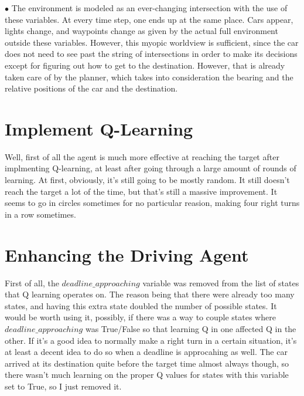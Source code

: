 \documentclass{amsart}
\begin{document}
\begin{list}{$\bullet$}{\addtolength{\parsep}{1mm}}
The environment is modeled as an ever-changing intersection with the use of these variables.  At every time step, one ends up at the same place.  Cars appear, lights change, and waypoints change as given by the actual full environment outside these variables.  However, this myopic worldview is sufficient, since the car does not need to see past the string of intersections in order to make its decisions except for figuring out how to get to the destination.  However, that is already taken care of by the planner, which takes into consideration the bearing and the relative positions of the car and the destination.
\end{list}
\section{Implement Q-Learning}
Well, first of all the agent is much more effective at reaching the target after implmenting Q-learning, at least after going through a large amount of rounds of learning.  At first, obviously, it's still going to be mostly random.  It still doesn't reach the target a lot of the time, but that's still a massive improvement.    It seems to go in circles sometimes for no particular reasion, making four right turns in a row sometimes.  
\section{Enhancing the Driving Agent}
First of all, the $deadline\_approaching$ variable was removed from the list of states that Q learning operates on.  The reason being that there were already too many states, and having this extra state doubled the number of possible states.  It would be worth using it, possibly, if there was a way to couple states where $deadline\_approaching$ was True/False so that learning Q in one affected Q in the other.  If it's a good idea to normally make a right turn in a certain situation, it's at least a decent idea to do so when a deadline is approcahing as well.  The car arrived at its destination quite before the target time almost always though, so there wasn't much learning on the proper Q values for states with this variable set to True, so I just removed it.
\end{document}
